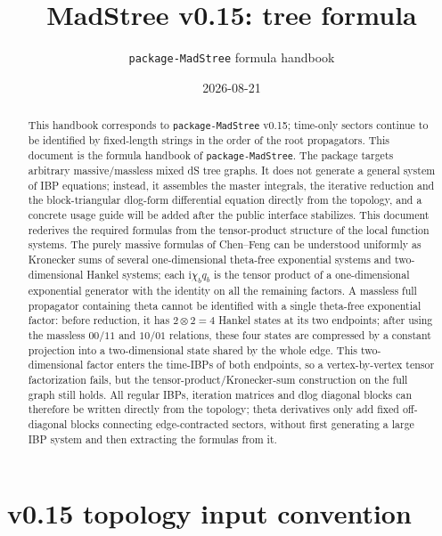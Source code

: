 \documentclass[11pt,a4paper]{article}
\title{MadStree v0.15: tree formula}
\author{\texttt{package-MadStree} formula handbook}
\date{2026-08-21}
\newcommand{\ii}{\mathrm i}
\begin{document}
\maketitle

\begin{abstract}
This handbook corresponds to \texttt{package-MadStree} v0.15; time-only sectors continue to be identified by fixed-length strings in the order of the root propagators.
This document is the formula handbook of \texttt{package-MadStree}. The package targets arbitrary massive/massless mixed dS tree graphs. It does not generate a general system of IBP equations; instead, it assembles the master integrals, the iterative reduction and the block-triangular dlog-form differential equation directly from the topology, and a concrete usage guide will be added after the public interface stabilizes. This document rederives the required formulas from the tensor-product structure of the local function systems. The purely massive formulas of Chen--Feng can be understood uniformly as Kronecker sums of several one-dimensional theta-free exponential systems and two-dimensional Hankel systems; each $\ii\chi_bq_b$ is the tensor product of a one-dimensional exponential generator with the identity on all the remaining factors. A massless full propagator containing theta cannot be identified with a single theta-free exponential factor: before reduction, it has $2\otimes2=4$ Hankel states at its two endpoints; after using the massless $00/11$ and $10/01$ relations, these four states are compressed by a constant projection into a two-dimensional state shared by the whole edge. This two-dimensional factor enters the time-IBPs of both endpoints, so a vertex-by-vertex tensor factorization fails, but the tensor-product/Kronecker-sum construction on the full graph still holds. All regular IBPs, iteration matrices and dlog diagonal blocks can therefore be written directly from the topology; theta derivatives only add fixed off-diagonal blocks connecting edge-contracted sectors, without first generating a large IBP system and then extracting the formulas from it.
\end{abstract}

\tableofcontents

\section{v0.15 topology input convention}
\end{document}
